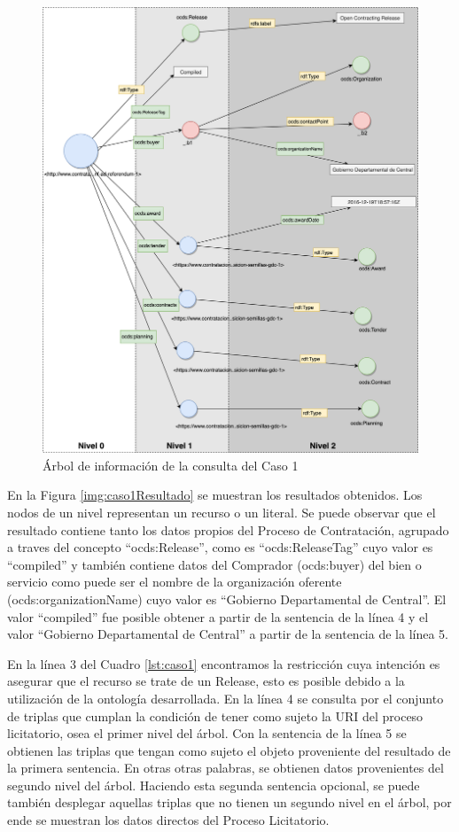  \begin{figure}[ht!]
    \centering
    \includegraphics[width=150mm]{figuras/Diagramas-Caso1.png}
    \caption{Árbol de información de la consulta del Caso 1}
    \label{img:caso1Diagrama}
 \end{figure}

En la Figura \ref{img:caso1Resultado} se muestran los resultados obtenidos. Los nodos de un nivel representan un recurso o un literal. Se puede observar que el resultado contiene tanto los datos propios del Proceso de Contratación, agrupado a traves del concepto “ocds:Release”, como es “ocds:ReleaseTag” cuyo valor es “compiled” y también contiene datos del Comprador (ocds:buyer) del bien o servicio como puede ser el nombre de la organización oferente (ocds:organizationName) cuyo valor es “Gobierno Departamental de Central”. El valor “compiled” fue posible obtener a partir de la sentencia de la línea 4 y el valor “Gobierno Departamental de Central” a partir de la sentencia de la línea 5.

En la línea 3 del Cuadro \ref{lst:caso1} encontramos la restricción cuya intención es asegurar que el recurso se trate de un Release, esto es posible debido a la utilización de la ontología desarrollada. En la línea 4 se consulta por el conjunto de triplas que cumplan la condición de tener como sujeto la URI del proceso licitatorio, osea el primer nivel del árbol. Con la sentencia de la línea 5 se obtienen las triplas que tengan como sujeto el objeto proveniente del resultado de la primera sentencia. En otras otras palabras, se obtienen datos provenientes del segundo nivel del árbol. Haciendo esta segunda sentencia opcional, se puede también desplegar aquellas triplas que no tienen un segundo nivel en el árbol, por ende se muestran los datos directos del Proceso Licitatorio.

